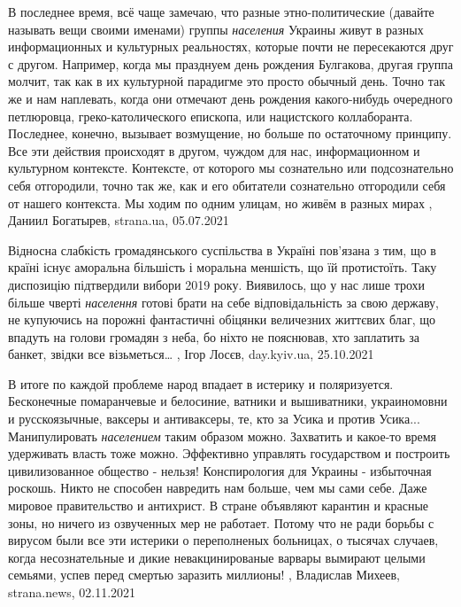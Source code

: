 В последнее время, всё чаще замечаю, что разные этно-политические (давайте
называть вещи своими именами) группы \emph{населения} Украины живут в разных
информационных и культурных реальностях, которые почти не пересекаются друг с
другом. Например, когда мы празднуем день рождения Булгакова, другая группа
молчит, так как в их культурной парадигме это просто обычный день. Точно так же
и нам наплевать, когда они отмечают день рождения какого-нибудь очередного
петлюровца, греко-католического епископа, или нацистского коллаборанта.
Последнее, конечно, вызывает возмущение, но больше по остаточному принципу. Все
эти действия происходят в другом, чуждом для нас, информационном и культурном
контексте. Контексте, от которого мы сознательно или подсознательно себя
отгородили, точно так же, как и его обитатели сознательно отгородили себя от
нашего контекста. Мы ходим по одним улицам, но живём в разных мирах
, 
Даниил Богатырев, strana.ua, 05.07.2021

Відносна слабкість громадянського суспільства в Україні пов’язана з тим, що в
країні існує аморальна більшість і моральна меншість, що їй протистоїть. Таку
диспозицію підтвердили вибори 2019 року. Виявилось, що у нас лише трохи більше
чверті \emph{населення} готові брати на себе відповідальність за свою державу, не
купуючись на порожні фантастичні обіцянки величезних життєвих благ, що впадуть
на голови громадян з неба, бо ніхто не пояснював, хто заплатить за банкет,
звідки все візьметься…
, 
Ігор Лосєв, day.kyiv.ua, 25.10.2021

В итоге по каждой проблеме народ впадает в истерику и поляризуется. Бесконечные
помаранчевые и белосиние, ватники и вышиватники, украиномовни и русскоязычные,
ваксеры и антиваксеры, те, кто за Усика и против Усика...  Манипулировать
\emph{населением} таким образом можно. Захватить и какое-то время удерживать
власть тоже можно. Эффективно управлять государством и построить цивилизованное
общество - нельзя!  Конспирология для Украины - избыточная роскошь. Никто не
способен навредить нам больше, чем мы сами себе.  Даже мировое правительство и
антихрист.  В стране объявляют карантин и красные зоны, но ничего из озвученных
мер не работает. Потому что не ради борьбы с вирусом были все эти истерики о
переполненых больницах, о тысячах случаев, когда несознательные и дикие
невакцинированые варвары вымирают целыми семьями, успев перед смертью заразить
миллионы!
, 
Владислав Михеев, strana.news, 02.11.2021

